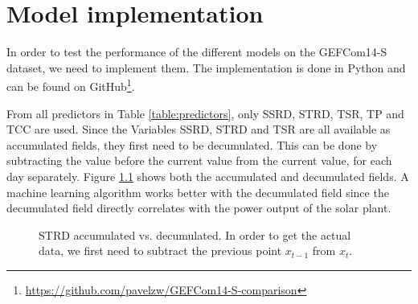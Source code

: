 \chapter{Model implementation}
\label{ch:model-implementation}

In order to test the performance of the different models on the GEFCom14-S dataset, we need to implement them. 
The implementation is done in Python and can be found on GitHub\footnote{\url{https://github.com/pavelzw/GEFCom14-S-comparison}}.

From all predictors in Table \ref{table:predictors}, only SSRD, STRD, TSR, TP and TCC are used. 
Since the Variables SSRD, STRD and TSR are all available as accumulated fields, they first need to be decumulated.
This can be done by subtracting the value before the current value from the current value, for each day separately. 
Figure \ref{fig:strd-accumulated-vs-decumulated} shows both the accumulated and decumulated fields. 
A machine learning algorithm works better with the decumulated field since the decumulated field directly correlates 
with the power output of the solar plant.

\begin{figure}[h]%
    \centering
    \qquad
    \caption[STRD accumulated vs. decumulated]{STRD accumulated vs. decumulated. 
    In order to get the actual data, we first need to subtract the previous point \(x_{t-1}\) from \(x_t\).}%
    \label{fig:strd-accumulated-vs-decumulated}%
\end{figure}

